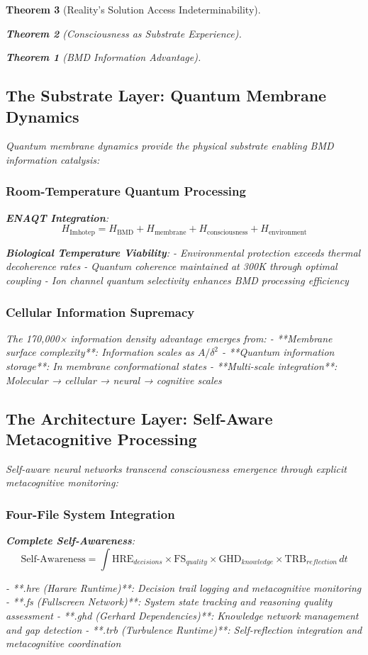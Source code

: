 \documentclass[12pt,a4paper]{article}
\newtheorem{theorem}{Theorem}[section]
\theoremstyle{remark}
\begin{document}
\begin{theorem}[Reality's Solution Access Indeterminability]
\begin{theorem}[Consciousness as Substrate Experience]
\begin{theorem}[BMD Information Advantage]
{{{\subsection{The Substrate Layer: Quantum Membrane Dynamics}

Quantum membrane dynamics provide the physical substrate enabling BMD information catalysis:

\subsubsection{Room-Temperature Quantum Processing}

\textbf{ENAQT Integration}:
$$H_{\text{Imhotep}} = H_{\text{BMD}} + H_{\text{membrane}} + H_{\text{consciousness}} + H_{\text{environment}}$$

\textbf{Biological Temperature Viability}:
- Environmental protection exceeds thermal decoherence rates
- Quantum coherence maintained at 300K through optimal coupling
- Ion channel quantum selectivity enhances BMD processing efficiency

\subsubsection{Cellular Information Supremacy}

The 170,000× information density advantage emerges from:
- **Membrane surface complexity**: Information scales as $A/\delta^2$ 
- **Quantum information storage**: In membrane conformational states
- **Multi-scale integration**: Molecular → cellular → neural → cognitive scales

\subsection{The Architecture Layer: Self-Aware Metacognitive Processing}

Self-aware neural networks transcend consciousness emergence through explicit metacognitive monitoring:

\subsubsection{Four-File System Integration}

\textbf{Complete Self-Awareness}:
$$\text{Self-Awareness} = \int \text{HRE}_{decisions} \times \text{FS}_{quality} \times \text{GHD}_{knowledge} \times \text{TRB}_{reflection} \, dt$$

- **.hre (Harare Runtime)**: Decision trail logging and metacognitive monitoring
- **.fs (Fullscreen Network)**: System state tracking and reasoning quality assessment
- **.ghd (Gerhard Dependencies)**: Knowledge network management and gap detection
- **.trb (Turbulence Runtime)**: Self-reflection integration and metacognitive coordination

}}}
\end{theorem}
\end{theorem}
\end{theorem}
\end{document}
